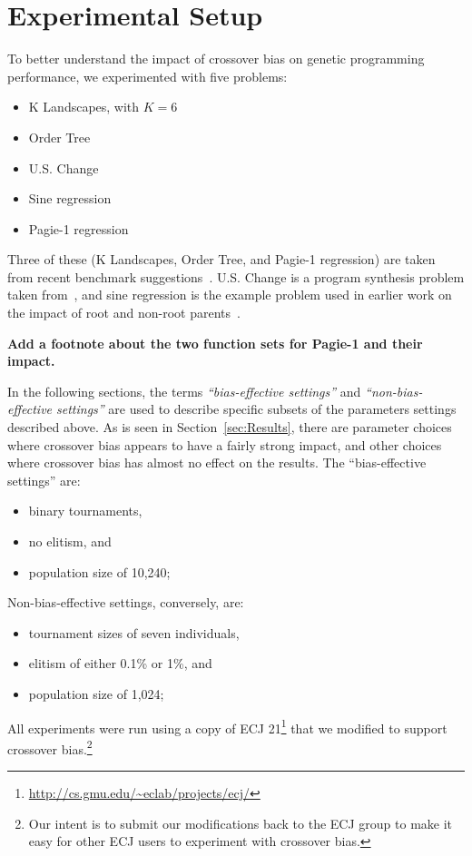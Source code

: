\documentclass{sig-alternate}
\begin{document}
\section{Experimental Setup} \label{sec:Experiments}

To better understand the impact of crossover bias on genetic programming performance, we experimented with five problems:
\begin{itemize}
	\item K Landscapes, with $K=6$ \cite{vanneschi2011k}
	\item Order Tree \cite{}
	\item U.S. Change
	\item Sine regression \cite{poli08:fieldguide}
	\item Pagie-1 regression \cite{}
\end{itemize}
Three of these (K Landscapes, Order Tree, and Pagie-1 regression) are taken from recent benchmark suggestions~\cite{gp-benchmarks-2013}. U.S. Change is a program synthesis problem taken from~\cite{USChangeSource}, and sine regression is the example problem used in earlier work on the impact of root and non-root parents~\cite{McPheeDonatucciDramdahl:2014}.

\textbf{Add a footnote about the two function sets for Pagie-1 and their impact.}

In the following sections, the terms \emph{``bias-effective settings''} and \emph{``non-bias-effective settings''} 
are used to
describe specific subsets of the parameters settings described above. As is seen in Section~\ref{sec:Results}, 
there are parameter choices where crossover bias appears to have a fairly strong impact, and other choices 
where crossover bias has almost no effect on the results. The ``bias-effective settings'' are:
\begin{itemize}
\item binary tournaments,
\item no elitism, and
\item population size of 10,240;
\end{itemize}
Non-bias-effective settings, conversely, are:
\begin{itemize}
\item tournament sizes of seven individuals,
\item elitism of either 0.1\% or 1\%, and
\item population size of 1,024;
\end{itemize}

All experiments were run using a copy of ECJ 21\footnote{\url{http://cs.gmu.edu/~eclab/projects/ecj/}} 
that we modified to support crossover bias.\footnote{Our intent is to submit our modifications back to the 
ECJ group to make it easy for other ECJ users to experiment with crossover bias.}
\end{document}
